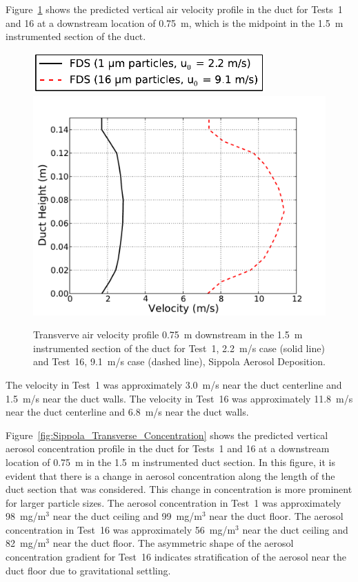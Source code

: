 \noindent Figure~\ref{fig:Sippola_Transverse_Velocity} shows the predicted vertical air velocity profile in the duct for Tests~1 and 16 at a downstream location of 0.75~m, which is the midpoint in the 1.5~m instrumented section of the duct.

\begin{figure}[!ht]
\centering
\includegraphics[width=3.5in]{Fig_Sippola_Aerosol_Deposition_Transverse_Legend.pdf}
\includegraphics[width=5.0in]{Fig_Sippola_Aerosol_Deposition_Transverse_Velocity.pdf}
\caption[Transverse air velocity profile, Sippola Aerosol Deposition]
{Transverve air velocity profile 0.75~m downstream in the 1.5~m instrumented section of the duct for Test~1, 2.2~m/s case (solid line) and Test~16, 9.1~m/s case (dashed line), Sippola Aerosol Deposition.}
\label{fig:Sippola_Transverse_Velocity}
\end{figure}

The velocity in Test~1 was approximately 3.0~m/s near the duct centerline and 1.5~m/s near the duct walls. The velocity in Test~16 was approximately 11.8~m/s near the duct centerline and 6.8~m/s near the duct walls.

\noindent Figure~\ref{fig:Sippola_Transverse_Concentration} shows the predicted vertical aerosol concentration profile in the duct for Tests~1 and 16 at a downstream location of 0.75~m in the 1.5~m instrumented duct section. In this figure, it is evident that there is a change in aerosol concentration along the length of the duct section that was considered. This change in concentration is more prominent for larger particle sizes. The aerosol concentration in Test~1 was approximately 98~mg/m$^3$ near the duct ceiling and 99~mg/m$^3$ near the duct floor. The aerosol concentration in Test~16 was approximately 56~mg/m$^3$ near the duct ceiling and 82~mg/m$^3$ near the duct floor. The asymmetric shape of the aerosol concentration gradient for Test~16 indicates stratification of the aerosol near the duct floor due to gravitational settling.

